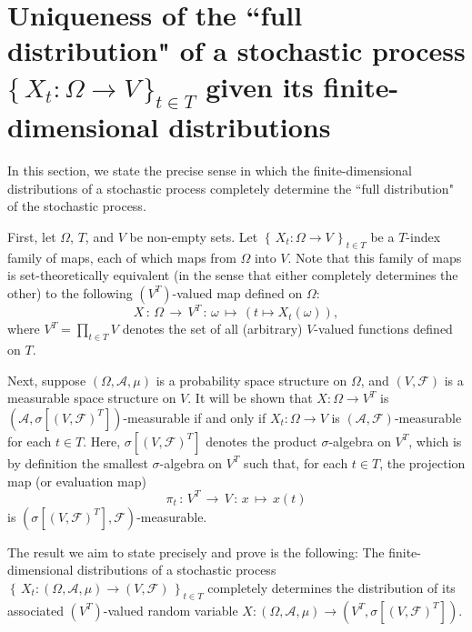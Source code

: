 

\section{Uniqueness of the ``full distribution" of a stochastic process
$\{\,X_{t} : \Omega \longrightarrow V\,\}_{t\in T}$ given
its finite-dimensional distributions}
\setcounter{theorem}{0}
\setcounter{equation}{0}

In this section, we state the precise sense in which the finite-dimensional distributions
of a stochastic process completely determine the ``full distribution" of the stochastic process.

First, let $\Omega$, $T$, and $V$ be non-empty sets.
Let $\left\{\,X_{t} : \Omega \longrightarrow V \,\right\}_{t \in T}$
be a $T$-index family of maps, each of which maps from $\Omega$ into $V$.
Note that this family of maps is set-theoretically equivalent
(in the sense that either completely determines the other)
to the following $(V^{T})$-valued map defined on $\Omega$:
\begin{equation*}
X \,:\, \Omega \,\longrightarrow\, V^{T} \,:\, \omega \,\longmapsto\, \left(t \longmapsto X_{t}(\omega)\right),
\end{equation*}
where $V^{T} = \prod_{t\in T}V$ denotes the set of all (arbitrary) $V$-valued functions defined on $T$.

Next, suppose $\left(\Omega,\mathcal{A},\mu\right)$ is a probability space structure on $\Omega$,
and $\left(V,\mathcal{F}\right)$ is a measurable space structure on $V$.
It will be shown that $X : \Omega \longrightarrow V^{T}$ is
$\left(\mathcal{A},\sigma[(V,\mathcal{F})^{T}]\right)$-measurable if and only if
$X_{t} : \Omega \longrightarrow V$ is $(\mathcal{A},\mathcal{F})$-measurable for each $t \in T$.
Here, $\sigma[(V,\mathcal{F})^{T}]$ denotes the product $\sigma$-algebra on $V^{T}$,
which is by definition the smallest $\sigma$-algebra on $V^{T}$ such that,
for each $t \in T$, the projection map (or evaluation map)
\begin{equation*}
\pi_{t} \,:\, V^{T} \, \longrightarrow\, V
\,:\, x \,\longmapsto\, x(t)
\end{equation*}
is $\left(\sigma[(V,\mathcal{F})^{T}],\mathcal{F}\right)$-measurable.

The result we aim to state precisely and prove is the following:
The finite-dimensional distributions of a stochastic process
$\left\{\,X_{t}: (\Omega,\mathcal{A},\mu) \longrightarrow (V,\mathcal{F})\,\right\}_{t \in T}$
completely determines the distribution of its associated $(V^{T})$-valued random variable
$X : (\Omega,\mathcal{A},\mu) \longrightarrow (V^{T},\sigma[(V,\mathcal{F})^{T}])$.

